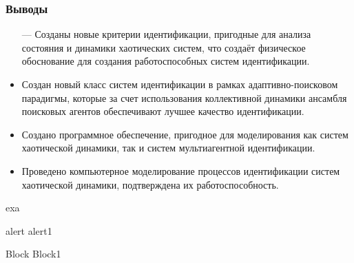 \documentclass[14pt,handout,utf8]{beamer}
\begin{document}
\begin{frame}
  \frametitle{Выводы}

  \begin{itemize}

    \item[---]
      Созданы новые критерии идентификации,
      пригодные для анализа состояния и динамики хаотических систем, что создаёт
      физическое  обоснование для создания работоспособных систем идентификации.

    \item
      Создан новый класс систем идентификации в рамках адаптивно-поисковом парадигмы,
      которые за счет использования коллективной динамики ансамбля поисковых
      агентов обеспечивают лучшее качество идентификации.

    \item
      Создано программное обеспечение, пригодное для моделирования как систем
      хаотической динамики, так и систем мультиагентной идентификации.

    \item
      Проведено компьютерное моделирование процессов идентификации систем хаотической
      динамики, подтверждена их работоспособность.

  \end{itemize}

  \begin{example}
    exa
  \end{example}


  \begin{alertblock}{alert}
    alert1
  \end{alertblock}


  \begin{block}{Block}
    Block1
  \end{block}



\end{frame}



%
%
%
\end{document}
